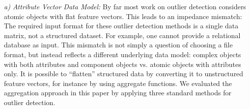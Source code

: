{				%
				\textit{a) Attribute Vector Data Model:}
				By far most work on outlier detection considers atomic objects with flat feature vectors.
				This leads to an impedance mismatch: 
				The required input format for these outlier detection methods is a single data matrix, not a structured dataset. For example, one cannot provide a relational database as input. This mismatch is not simply a question of choosing a file format, but instead reflects a different underlying data model: complex objects with both attributes and component objects vs. atomic objects with attributes only. 
				It is possible to ``flatten'' structured data by converting it to unstructured feature vectors, for instance by using aggregate functions. 
				We evaluated the aggregation approach in this paper by applying three standard methods for outlier detection.
				
}
